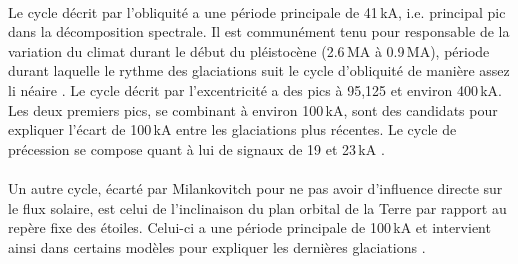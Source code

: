 \paragraph{} Le cycle décrit par l'obliquité a une période principale de 41\,kA, i.e. principal pic dans la décomposition spectrale. Il est communément tenu pour responsable de la variation du climat durant le début du pléistocène (2.6\,MA à 0.9\,MA), période durant laquelle le rythme des glaciations suit le cycle d'obliquité de manière assez li
néaire \cite{huggett}. Le cycle décrit par l'excentricité a des pics à 95,125 et environ 400\,kA. Les deux premiers pics, se combinant à environ 100\,kA, sont des candidats pour expliquer l'écart de 100\,kA entre les glaciations plus récentes. Le cycle de précession se compose quant à lui de signaux de 19 et 23\,kA \cite{huggett} \cite{wiki_milankovitch_cycles}.

\paragraph{} Un autre cycle, écarté par Milankovitch pour ne pas avoir d'influence directe sur le flux solaire, est celui de l'inclinaison du plan orbital de la Terre par rapport au repère fixe des étoiles. Celui-ci a une période principale de 100\,kA et intervient ainsi dans certains modèles pour expliquer les dernières glaciations \cite{muller1995}.
